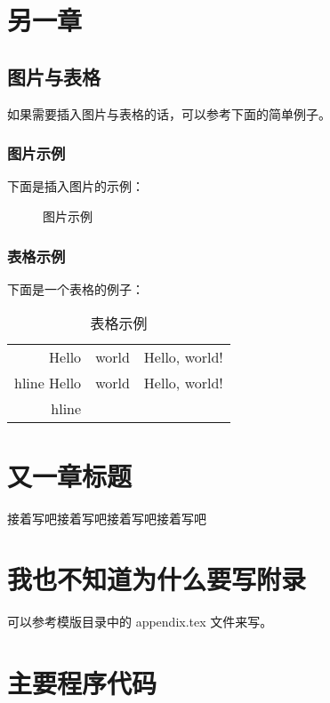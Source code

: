 \documentclass{swfcthesis}
\begin{document}
\chapter{另一章}

\section{图片与表格}

如果需要插入图片与表格的话，可以参考下面的简单例子。

\subsection{图片示例}

下面是插入图片的示例：

\begin{figure}[!ht]
  \centering
  \caption{图片示例}
  \label{fig:hello}
\end{figure}

\subsection{表格示例}

下面是一个表格的例子：

\begin{table}[!ht]
  \centering
  \begin{tabular}{|r|c|l|}    \hline
    Hello&world&Hello, world!\\hline
    Hello&world&Hello, world!\\hline
  \end{tabular}
  \caption{表格示例}
\end{table}

\chapter{又一章标题}

接着写吧接着写吧接着写吧接着写吧


\Appendix{}
\printbibliography[heading={bibintoc},title={参考文献}] %
\advisorinfopage{}                 %
\acknowledgmentspage{}             %


\chapter{我也不知道为什么要写附录} %

可以参考模版目录中的 appendix.tex 文件来写。

\chapter{主要程序代码} %


\begin{listing}[H]
\end{listing}  
\end{document}

